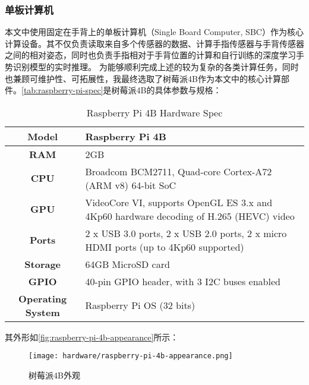 \subsubsection{单板计算机}
本文中使用固定在手背上的单板计算机（Single Board Computer, SBC）作为核心计算设备。其不仅负责读取来自多个传感器的数据、计算手指传感器与手背传感器之间的相对姿态，同时也负责手指相对于手背位置的计算和自行训练的深度学习手势识别模型的实时推理。
为能够顺利完成上述的较为复杂的各类计算任务，同时也兼顾可维护性、可拓展性，我最终选取了树莓派4B作为本文中的核心计算部件。\autoref{tab:raspberry-pi-spec}是树莓派4B的具体参数与规格：
\begin{table}[ht]
    \caption{\label{tab:raspberry-pi-spec}Raspberry Pi 4B Hardware Spec}
    \begin{tabularx}{\linewidth}{|c|X<{\centering}|}
        \hline
        {\bfseries Model} & Raspberry Pi 4B \\ \hline
        {\bfseries RAM} & 2GB \\ \hline
        {\bfseries CPU} & Broadcom BCM2711, Quad-core Cortex-A72 (ARM v8) 64-bit SoC \\ \hline
        {\bfseries GPU} & VideoCore VI, supports OpenGL ES 3.x and 4Kp60 hardware decoding of H.265 (HEVC) video \\ \hline
        {\bfseries Ports} & 2 x USB 3.0 ports, 2 x USB 2.0 ports, 2 x micro HDMI ports (up to 4Kp60 supported) \\ \hline
        {\bfseries Storage} & 64GB MicroSD card\\ \hline
        {\bfseries GPIO} & 40-pin GPIO header, with 3 I2C buses enabled\\ \hline
        {\bfseries Operating System} & Raspberry Pi OS (32 bits) \\ \hline
    \end{tabularx}
\end{table}

其外形如\autoref{fig:raspberry-pi-4b-appearance}所示：

\begin{figure}[H]
    \centering
    \texttt{[image: hardware/raspberry-pi-4b-appearance.png]}
    \caption{\label{fig:raspberry-pi-4b-appearance}树莓派4B外观}
\end{figure}

